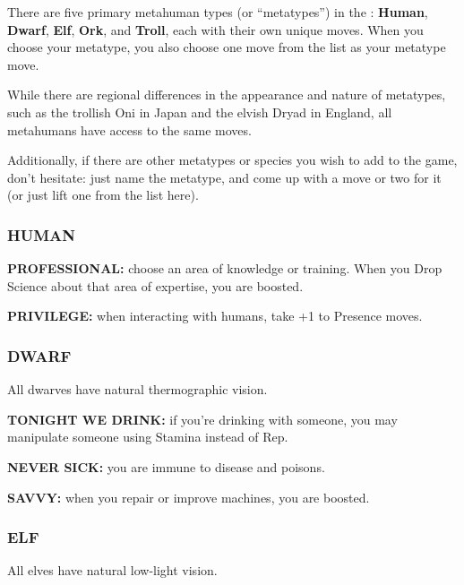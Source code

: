 \documentclass[oneside,10pt]{article}
\begin{document}
\begin{multicols}{2}
There are five primary metahuman types (or “metatypes”) in
the \SW{}: \textbf{Human}, \textbf{Dwarf}, \textbf{Elf}, \textbf{Ork}, and \textbf{Troll}, each
with their own unique moves. When you choose your metatype, you also choose one move from the list as your metatype move.

While there are regional differences in the appearance and
nature of metatypes, such as the trollish Oni in Japan and the
elvish Dryad in England, all metahumans have access to the
same moves.

Additionally, if there are other metatypes or species you wish
to add to the game, don’t hesitate: just name the metatype,
and come up with a move or two for it (or just lift one from
the list here).



\subsubsection{HUMAN}
\begin{adjustwidth*}{.5cm}{.5cm}

\textbf{PROFESSIONAL:} choose an area of knowledge or training.
When you Drop Science about that area of expertise, you
are boosted.

\textbf{PRIVILEGE:} when interacting with humans, take +1 to Presence moves.
\end{adjustwidth*}

\subsubsection{DWARF}

All dwarves have natural thermographic vision.

\begin{adjustwidth*}{.5cm}{.5cm}

\textbf{TONIGHT WE DRINK:} if you’re drinking with someone, you
may manipulate someone using Stamina instead of
Rep.

\textbf{NEVER SICK:} you are immune to disease and
poisons.

\textbf{SAVVY:} when you repair or improve machines, you are
boosted.
\end{adjustwidth*}

\subsubsection{ELF}
All elves have natural low-light vision.

\begin{adjustwidth*}{.5cm}{.5cm}


\end{adjustwidth*}
\end{multicols}
\end{document}
